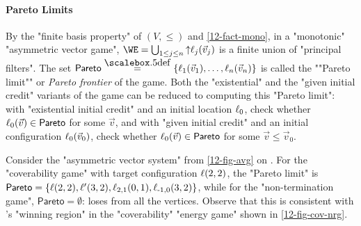 \paragraph{Pareto Limits}\AP By the "finite basis property" of
$(V,{\leq})$ and \cref{12-fact-mono}, in a "monotonic" "asymmetric
vector game", $\WE=\bigcup_{1\leq j\leq n}{\uparrow}\loc_j(\vec v_j)$
is a finite union of "principal filters".  The set
$\mathsf{Pareto}\eqdef\{\loc_1(\vec v_1),\dots,\loc_n(\vec v_n)\}$ is
called the ""Pareto limit"" or \emph{Pareto frontier} of the game.
Both the "existential" and the "given initial credit" variants of the
game can be reduced to computing this "Pareto limit": with
"existential initial credit" and an initial location $\ell_0$, check
whether $\ell_0(\vec v)\in\mathsf{Pareto}$ for some $\vec v$, and with
"given initial credit" and an initial configuration $\ell_0(\vec v_0)$, check
whether $\ell_0(\vec v)\in\mathsf{Pareto}$ for some $\vec v\leq\vec
v_0$.
\begin{example}
  Consider the "asymmetric vector system" from \cref{12-fig-avg} on
  .  For the "coverability game" with target
  configuration $\ell(2,2)$, the "Pareto limit" is
  $\mathsf{Pareto}=\{\ell(2,2),\ell'(3,2),\ell_{2,1}(0,1),\ell_{\text-1,0}(3,2)\}$,
  while for the "non-termination game", $\mathsf{Pareto}=\emptyset$:
  \Eve loses from all the vertices.  Observe that this is consistent
  with \Eve's "winning region" in the "coverability" "energy game"
  shown in \cref{12-fig-cov-nrg}.
\end{example}



